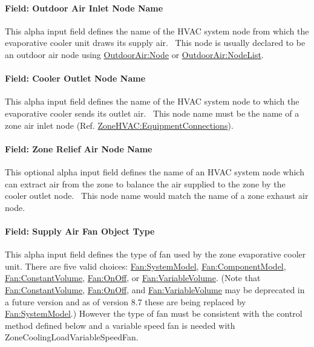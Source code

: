 \paragraph{Field: Outdoor Air Inlet Node Name}\label{field-outdoor-air-inlet-node-name-1-000}

This alpha input field defines the name of the HVAC system node from which the evaporative cooler unit draws its supply air.~ This node is usually declared to be an outdoor air node using \hyperref[outdoorairnode]{OutdoorAir:Node} or \hyperref[outdoorairnodelist]{OutdoorAir:NodeList}.

\paragraph{Field: Cooler Outlet Node Name}\label{field-cooler-outlet-node-name}

This alpha input field defines the name of the HVAC system node to which the evaporative cooler sends its outlet air.~ This node name must be the name of a zone air inlet node (Ref. \hyperref[zonehvacequipmentconnections]{ZoneHVAC:EquipmentConnections}).

\paragraph{Field: Zone Relief Air Node Name}\label{field-zone-relief-air-node-name}

This optional alpha input field defines the name of an HVAC system node which can extract air from the zone to balance the air supplied to the zone by the cooler outlet node.~ This node name would match the name of a zone exhaust air node.

\paragraph{Field: Supply Air Fan Object Type}\label{field-supply-air-fan-object-type-3-000}

This alpha input field defines the type of fan used by the zone evaporative cooler unit.  There are five valid choices: \hyperref[fansystemmodel]{Fan:SystemModel}, \hyperref[fancomponentmodel]{Fan:ComponentModel}, \hyperref[fanconstantvolume]{Fan:ConstantVolume}, \hyperref[fanonoff]{Fan:OnOff}, or \hyperref[fanvariablevolume]{Fan:VariableVolume}.  (Note that \hyperref[fanconstantvolume]{Fan:ConstantVolume}, \hyperref[fanonoff]{Fan:OnOff}, and \hyperref[fanvariablevolume]{Fan:VariableVolume} may be deprecated in a future version and as of version 8.7 these are being replaced by \hyperref[fansystemmodel]{Fan:SystemModel}.)
However the type of fan must be consistent with the control method defined below and a variable speed fan is needed with ZoneCoolingLoadVariableSpeedFan.

